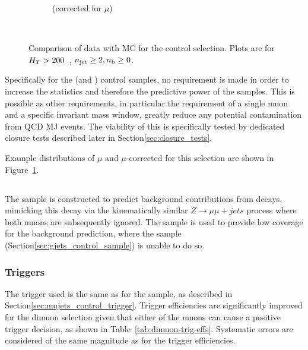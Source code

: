 \begin{figure}[t]
\begin{subfigure}[b]{0.48\textwidth}
      \caption{\met (corrected for $\mu$)}
    \end{subfigure} \\
    \caption{\label{fig:datamc_mu_inc}
    Comparison of data with MC for the \mj control selection. Plots 
    are for $H_T>200$~\gev, $n_{\text{jet}}\geq2, n_{\text{b}}\geq0$.
    }
\end{figure}

Specifically for the \mj (and \mmj) control samples, no \alphat requirement is
made in order to increase the statistics and therefore the predictive power of 
the samples. This is possible as other requirements, in particular the 
requirement of
a single muon and a specific invariant mass window, greatly reduce any potential
contamination from QCD MJ events. The viability of this is specifically tested 
by dedicated closure tests described later in Section\ref{sec:closure_tests}.

Example distributions of $\mu$ \Pt and $\mu\text{-corrected}$ \met for this selection
are shown in Figure~\ref{fig:datamc_mu_inc}.


\subsection{\mmj}
The \mmj sample is constructed to predict background contributions from \zinv 
decays, mimicking this decay via the kinematically similar $Z\to\mu\mu + jets$
process where both muons are subsequently ignored.
The sample is used to provide low \HT coverage for the \zinv background 
prediction, where the \gj sample (Section\ref{sec:gjets_control_sample})
is unable to do so.

\subsubsection{Triggers}
The trigger used is the same as for the \mj sample, as described in
Section\ref{sec:mujets_control_trigger}. Trigger efficiencies are significantly
improved for the dimuon selection given that either of the muons 
can cause a positive trigger decision, as shown in Table~\ref{tab:dimuon-trig-effs}. 
Systematic errors are considered of the same magnitude as for the \mj trigger
efficiencies.

                                       
